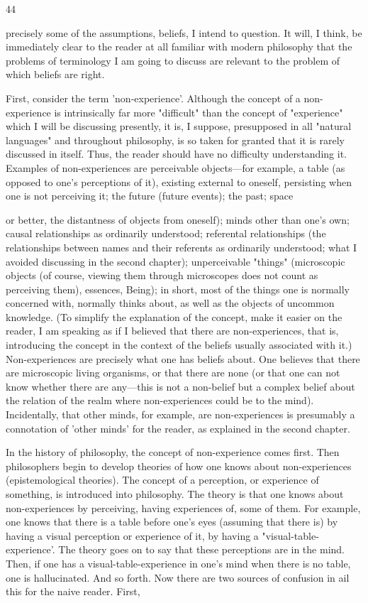\documentclass[10pt,twoside]{memoir}
\begin{document}
\begin{enumerate}
{{{{{{{{{44 


precisely some of the assumptions, beliefs, I intend to question. It will, I 
think, be immediately clear to the reader at all familiar with modern 
philosophy that the problems of terminology I am going to discuss are 
relevant to the problem of which beliefs are right. 

First, consider the term 'non-experience'. Although the concept of a 
non-experience is intrinsically far more "difficult" than the concept of 
"experience" which I will be discussing presently, it is, I suppose, 
presupposed in all "natural languages" and throughout philosophy, is so 
taken for granted that it is rarely discussed in itself. Thus, the reader should 
have no difficulty understanding it. Examples of non-experiences are 
perceivable objects---for example, a table (as opposed to one's perceptions of 
it), existing external to oneself, persisting when one is not perceiving it; the 
future (future events); the past; space {or better, the distantness of objects 
from oneself); minds other than one's own; causal relationships as ordinarily 
understood; referental relationships (the relationships between names and 
their referents as ordinarily understood; what I avoided discussing in the 
second chapter); unperceivable "things" (microscopic objects (of course, 
viewing them through microscopes does not count as perceiving them), 
essences, Being); in short, most of the things one is normally concerned with, 
normally thinks about, as well as the objects of uncommon knowledge. (To 
simplify the explanation of the concept, make it easier on the reader, I am 
speaking as if I believed that there are non-experiences, that is, introducing 
the concept in the context of the beliefs usually associated with it.) 
Non-experiences are precisely what one has beliefs about. One believes that 
there are microscopic living organisms, or that there are none (or that one 
can not know whether there are any---this is not a non-belief but a complex 
belief about the relation of the realm where non-experiences could be to the 
mind). Incidentally, that other minds, for example, are non-experiences is 
presumably a connotation of 'other minds' for the reader, as explained in the 
second chapter. 

In the history of philosophy, the concept of non-experience comes first. 
Then philosophers begin to develop theories of how one knows about 
non-experiences (epistemological theories). The concept of a perception, or 
experience of something, is introduced into philosophy. The theory is that 
one knows about non-experiences by perceiving, having experiences of, some 
of them. For example, one knows that there is a table before one's eyes 
(assuming that there is) by having a visual perception or experience of it, by 
having a "visual-table-experience'. The theory goes on to say that these 
perceptions are in the mind. Then, if one has a visual-table-experience in 
one's mind when there is no table, one is hallucinated. And so forth. Now 
there are two sources of confusion in ail this for the naive reader. First, 


}}}}}}}}}}
\end{enumerate}
\end{document}
